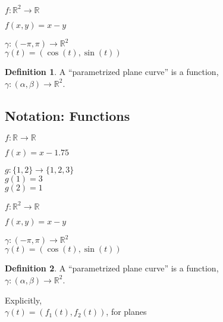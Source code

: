 \documentclass[twocolumn,20pt,fleqn]{extarticle}
\newcommand{\sep}{\vspace{0.5cm}}
\theoremstyle{plain}
\theoremstyle{definition}
\newtheorem*{definition}{Definition}
\theoremstyle{remark}
\begin{document}
\sep

$ f: \mathbb{R}^2  \to \mathbb{R}$

$f(  x,y  ) = x - y$


\sep

$\gamma :  (-\pi,\pi)  \to \mathbb{R}^2$\\
$\gamma(t) = (\cos(t), \sin(t))$



\newpage



\begin{definition}
  A  ``parametrized plane curve''  is a  function,\\ $\gamma  : (\alpha, \beta) \to \mathbb{R}^2$.
\end{definition}




\clearpage




\subsection{Notation: Functions}

$ f: \mathbb{R}  \to \mathbb{R}$

$f(x) = x - 1.75$\\

\sep

  $g : \{1,2\} \to \{1,2,3\}$\\
    $g(1) = 3$\\
    $g(2) = 1$\\

\sep

$ f: \mathbb{R}^2  \to \mathbb{R}$

$f(  x,y  ) = x - y$


\sep

$\gamma :  (-\pi,\pi)  \to \mathbb{R}^2$\\
$\gamma(t) = (\cos(t), \sin(t))$



\newpage



\begin{definition}
  A  ``parametrized plane curve''  is a  function,\\ $\gamma  : (\alpha, \beta) \to \mathbb{R}^2$.
\end{definition}

Explicitly,\\
$\gamma(t) = (f_1(t), f_2(t))$, for planes


\clearpage
\end{document}
